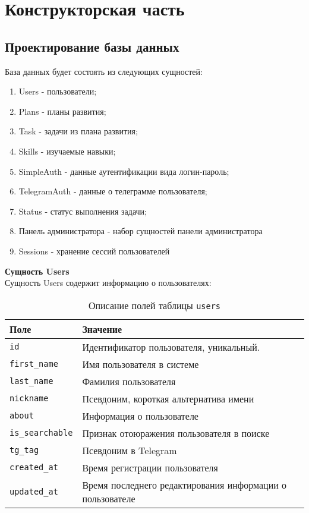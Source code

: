 \chapter{Конструкторская часть}

\section{Проектирование базы данных}
База данных будет состоять из следующих сущностей:
\begin{enumerate}
\item Users - пользователи;
\item Plans - планы развития;
\item Task - задачи из плана развития;
\item Skills - изучаемые навыки;
\item SimpleAuth - данные аутентификации вида логин-пароль;
\item TelegramAuth - данные о телеграмме пользователя;
\item Status - статус выполнения задачи;
\item Панель администратора - набор сущностей панели администратора
\item Sessions - хранение сессий пользователей
\end{enumerate}

\newpage
\noindent\textbf{Сущность Users}\\
Сущность Users содержит информацию о пользователях:
\begin{table}[!ht]
    \caption{Описание полей таблицы \texttt{users}}
    \label{tbl:users}
    \begin{center}
        \begin{tabular}{|p{}p{}|}
            \hline
            \textbf{Поле} & \textbf{Значение} \\\hline
            \texttt{id} & Идентификатор пользователя, уникальный. \\\hline
            \texttt{first\_name} & Имя пользователя в системе\\\hline
            \texttt{last\_name} & Фамилия пользователя \\\hline
            \texttt{nickname} & Псевдоним, короткая альтернатива имени \\\hline
            \texttt{about} & Информация о пользователе \\\hline
            \texttt{is\_searchable} & Признак отоюражения пользователя в поиске \\\hline
            \texttt{tg\_tag} & Псевдоним в Telegram \\\hline
            \texttt{created\_at} & Время регистрации пользователя\\\hline
            \texttt{updated\_at} & Время последнего редактирования информации о пользователе \\\hline
        \end{tabular}
    \end{center}
\end{table}

